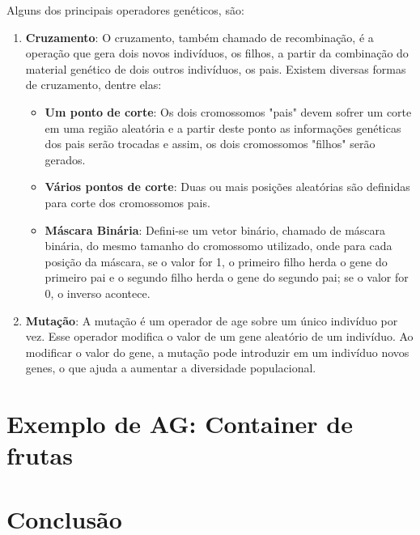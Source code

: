 \documentclass[12pt]{article}
\begin{document}
Alguns dos principais operadores genéticos, são:
\begin{enumerate}[\textbf{(i)}]
	\item \textbf{Cruzamento}: O cruzamento, também chamado de recombinação, é a operação que
		  gera dois novos indivíduos, os filhos, a partir da combinação do material genético
		  de dois outros indivíduos, os pais.
		  Existem diversas formas de cruzamento, dentre elas:
		  \begin{itemize}
			\item \textbf{Um ponto de corte}: Os dois cromossomos "pais" devem sofrer um corte
			em uma região aleatória e a partir deste ponto as informações genéticas dos pais
			serão trocadas e assim, os dois cromossomos "filhos" serão gerados.
			\item \textbf{Vários pontos de corte}: Duas ou mais posições aleatórias são
			definidas para corte dos cromossomos pais.
			\item \textbf{Máscara Binária}: Defini-se um vetor binário, chamado de máscara
			binária, do mesmo tamanho do cromossomo utilizado, onde para cada posição da
			máscara, se o valor for 1, o primeiro filho herda o gene do primeiro pai e o
			segundo filho herda o gene do segundo pai; se o valor for 0, o inverso acontece.
		  \end{itemize}
	\item \textbf{Mutação}: A mutação é um operador de age sobre um único indivíduo por vez.
		  Esse operador modifica o valor de um gene aleatório de um indivíduo. Ao modificar
		  o valor do gene, a mutação pode introduzir em um indivíduo novos genes, o que
		  ajuda a aumentar a diversidade populacional.

\end{enumerate}

\section{Exemplo de AG: Container de frutas}



\section{Conclusão}
\end{document}

